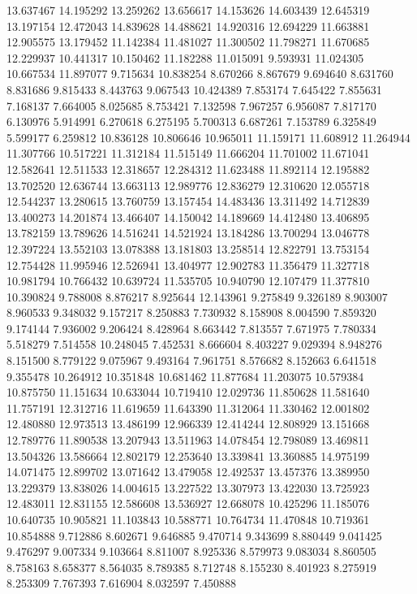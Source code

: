 13.637467
14.195292
13.259262
13.656617
14.153626
14.603439
12.645319
13.197154
12.472043
14.839628
14.488621
14.920316
12.694229
11.663881
12.905575
13.179452
11.142384
11.481027
11.300502
11.798271
11.670685
12.229937
10.441317
10.150462
11.182288
11.015091
9.593931
11.024305
10.667534
11.897077
9.715634
10.838254
8.670266
8.867679
9.694640
8.631760
8.831686
9.815433
8.443763
9.067543
10.424389
7.853174
7.645422
7.855631
7.168137
7.664005
8.025685
8.753421
7.132598
7.967257
6.956087
7.817170
6.130976
5.914991
6.270618
6.275195
5.700313
6.687261
7.153789
6.325849
5.599177
6.259812
10.836128
10.806646
10.965011
11.159171
11.608912
11.264944
11.307766
10.517221
11.312184
11.515149
11.666204
11.701002
11.671041
12.582641
12.511533
12.318657
12.284312
11.623488
11.892114
12.195882
13.702520
12.636744
13.663113
12.989776
12.836279
12.310620
12.055718
12.544237
13.280615
13.760759
13.157454
14.483436
13.311492
14.712839
13.400273
14.201874
13.466407
14.150042
14.189669
14.412480
13.406895
13.782159
13.789626
14.516241
14.521924
13.184286
13.700294
13.046778
12.397224
13.552103
13.078388
13.181803
13.258514
12.822791
13.753154
12.754428
11.995946
12.526941
13.404977
12.902783
11.356479
11.327718
10.981794
10.766432
10.639724
11.535705
10.940790
12.107479
11.377810
10.390824
9.788008
8.876217
8.925644
12.143961
9.275849
9.326189
8.903007
8.960533
9.348032
9.157217
8.250883
7.730932
8.158908
8.004590
7.859320
9.174144
7.936002
9.206424
8.428964
8.663442
7.813557
7.671975
7.780334
5.518279
7.514558
10.248045
7.452531
8.666604
8.403227
9.029394
8.948276
8.151500
8.779122
9.075967
9.493164
7.961751
8.576682
8.152663
6.641518
9.355478
10.264912
10.351848
10.681462
11.877684
11.203075
10.579384
10.875750
11.151634
10.633044
10.719410
12.029736
11.850628
11.581640
11.757191
12.312716
11.619659
11.643390
11.312064
11.330462
12.001802
12.480880
12.973513
13.486199
12.966339
12.414244
12.808929
13.151668
12.789776
11.890538
13.207943
13.511963
14.078454
12.798089
13.469811
13.504326
13.586664
12.802179
12.253640
13.339841
13.360885
14.975199
14.071475
12.899702
13.071642
13.479058
12.492537
13.457376
13.389950
13.229379
13.838026
14.004615
13.227522
13.307973
13.422030
13.725923
12.483011
12.831155
12.586608
13.536927
12.668078
10.425296
11.185076
10.640735
10.905821
11.103843
10.588771
10.764734
11.470848
10.719361
10.854888
9.712886
8.602671
9.646885
9.470714
9.343699
8.880449
9.041425
9.476297
9.007334
9.103664
8.811007
8.925336
8.579973
9.083034
8.860505
8.758163
8.658377
8.564035
8.789385
8.712748
8.155230
8.401923
8.275919
8.253309
7.767393
7.616904
8.032597
7.450888
